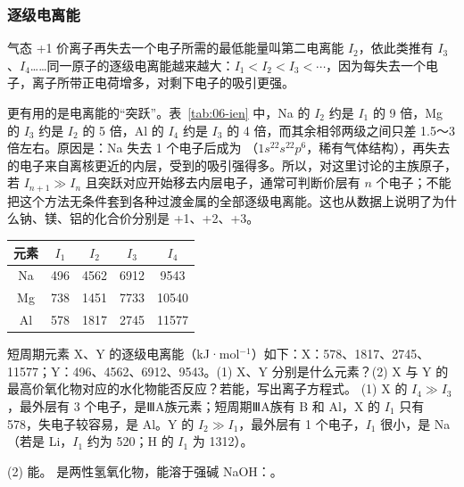 \subsubsection{逐级电离能}
气态 +1 价离子再失去一个电子所需的最低能量叫第二电离能 $I_2$，依此类推有 $I_3$、$I_4$……同一原子的逐级电离能越来越大：$I_1<I_2<I_3<\cdots$，因为每失去一个电子，离子所带正电荷增多，对剩下电子的吸引更强。

更有用的是电离能的“突跃”。表~\ref{tab:06-ien} 中，Na 的 $I_2$ 约是 $I_1$ 的 9 倍，Mg 的 $I_3$ 约是 $I_2$ 的 5 倍，Al 的 $I_4$ 约是 $I_3$ 的 4 倍，而其余相邻两级之间只差 1.5～3 倍左右。原因是：Na 失去 1 个电子后成为 （$1s^22s^22p^6$，稀有气体结构），再失去的电子来自离核更近的内层，受到的吸引强得多。所以，对这里讨论的主族原子，若 $I_{n+1}\gg I_n$ 且突跃对应开始移去内层电子，通常可判断价层有 $n$ 个电子；不能把这个方法无条件套到各种过渡金属的全部逐级电离能。这也从数据上说明了为什么钠、镁、铝的化合价分别是 +1、+2、+3。

\begin{center}
\begin{minipage}{\linewidth}\centering\small
{}\label{tab:06-ien}
\begin{tabular}{ccccc}
\toprule
元素 & $I_1$ & $I_2$ & $I_3$ & $I_4$ \\
\midrule
Na & 496 & \textcolor{warnred}{4562} & 6912 & 9543 \\
Mg & 738 & 1451 & \textcolor{warnred}{7733} & 10540 \\
Al & 578 & 1817 & 2745 & \textcolor{warnred}{11577} \\
\bottomrule
\end{tabular}
\end{minipage}
\end{center}

\begin{liti}[典型]
短周期元素 X、Y 的逐级电离能（kJ·mol$^{-1}$）如下：X：578、1817、2745、11577；Y：496、4562、6912、9543。(1) X、Y 分别是什么元素？(2) X 与 Y 的最高价氧化物对应的水化物能否反应？若能，写出离子方程式。
\tcblower
\jie (1) X 的 $I_4\gg I_3$，最外层有 3 个电子，是ⅢA族元素；短周期ⅢA族有 B 和 Al，X 的 $I_1$ 只有 578\kjmol{}，失电子较容易，是 Al。Y 的 $I_2\gg I_1$，最外层有 1 个电子，$I_1$ 很小，是 Na（若是 Li，$I_1$ 约为 520\kjmol{}；H 的 $I_1$ 为 1312\kjmol{}）。\par
(2) 能。 是两性氢氧化物，能溶于强碱 NaOH：。
\end{liti}

